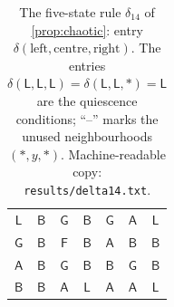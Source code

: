 \begin{table}[p]
\begin{tabular}{@{}cc|ccccc@{}}
$\mathsf{L}$ & $\mathsf{B}$ & $\mathsf{G}$ & $\mathsf{B}$ & $\mathsf{G}$ & $\mathsf{A}$ & $\mathsf{L}$\\
$\mathsf{G}$ & $\mathsf{B}$ & $\mathsf{F}$ & $\mathsf{B}$ & $\mathsf{A}$ & $\mathsf{B}$ & $\mathsf{B}$\\
$\mathsf{A}$ & $\mathsf{B}$ & $\mathsf{G}$ & $\mathsf{B}$ & $\mathsf{B}$ & $\mathsf{G}$ & $\mathsf{B}$\\
$\mathsf{B}$ & $\mathsf{B}$ & $\mathsf{A}$ & $\mathsf{L}$ & $\mathsf{A}$ & $\mathsf{A}$ & $\mathsf{L}$\\
\bottomrule
\end{tabular}
\caption{The five-state rule $\delta_{14}$ of \cref{prop:chaotic}: entry $\delta(\text{left},\text{centre},\text{right})$. The entries $\delta(\mathsf L,\mathsf L,\mathsf L)=\delta(\mathsf L,\mathsf L,\ast)=\mathsf L$ are the quiescence conditions; ``--'' marks the unused neighbourhoods $(\ast,y,\ast)$. Machine-readable copy: \texttt{results/delta14.txt}.}
\label{tab:delta14}
\end{table}
